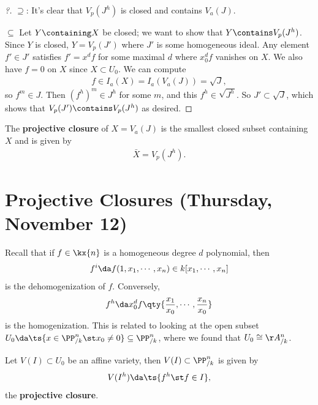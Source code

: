 \begin{proof}[?]

\(\supseteq\): It's clear that \(V_p(J^h)\) is closed and contains
\(V_a(J)\).

\(\subseteq\) Let \(Y\containing X\) be closed; we want to show that
\(Y\contains V_p(J^h)\). Since \(Y\) is closed, \(Y = V_p(J')\) where
\(J'\) is some homogeneous ideal. Any element \(f'\in J'\) satisfies
\(f' = x^d f\) for some maximal \(d\) where \(x_0^d f\) vanishes on
\(X\). We also have \(f=0\) on \(X\) since \(X\subset U_0\). We can
compute
\begin{align*}  
f\in I_a(X) = I_a(V_a(J)) = \sqrt J
,\end{align*} so \(f^m\in J\). Then \((f^h)^m \in J^h\) for some \(m\),
and this \(f^h \in \sqrt{J^h}\). So \(J'\subset \sqrt J\), which shows
that \(V_p(J') \contains V_p(J^h)\) as desired.

\end{proof}

\begin{definition}

The \textbf{projective closure} of \(X = V_a(J)\) is the smallest closed
subset containing \(X\) and is given by
\begin{align*}  
\bar{X} = V_p(J^h)
.\end{align*}

\end{definition}

\hypertarget{projective-closures-thursday-november-12}{%
\section{Projective Closures (Thursday, November
12)}\label{projective-closures-thursday-november-12}}

Recall that if \(f\in \kx{n}\) is a homogeneous degree \(d\) polynomial,
then
\begin{align*}
f^i \da f(1, x_1, \cdots, x_n) \in k[x_1,\cdots, x_n]
\end{align*} is the dehomogenization of \(f\). Conversely,
\begin{align*}
f^h \da x_0^d f\qty{ {x_1 \over x_0}, \cdots, {x_n \over x_0} }
\end{align*} is the homogenization. This is related to looking at the
open subset
\(U_0 \da \ts{ x\in \PP^n_{/k} \st x_0\neq 0} \subseteq \PP^n_{/k}\),
where we found that \(U_0 \cong \AA^n_{/k}\).

\begin{proposition}

Let \(V(I) \subset U_0\) be an affine variety, then
\(V(I) \subset \PP^n_{/k}\) is given by
\begin{align*}
V(I^h) \da \ts{f^h \st f\in I}
,\end{align*} the \textbf{projective closure}.

\end{proposition}

